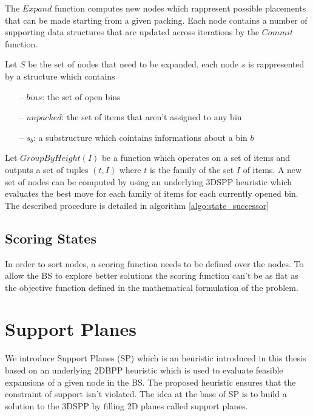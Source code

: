 

The $Expand$ function computes new nodes which rappresent possible placements that can be made starting from a given packing.
Each node contains a number of supporting data structures that are updated across iterations by the $Commit$ function.

Let $S$ be the set of nodes that need to be expanded, each node $s$ is rappresented by a structure which contains
\begin{itemize}
    \item[--] $bins$: the set of open bins
    \item[--] $unpacked$: the set of items that aren't assigned to any bin
    \item[--] $s_b$: a substructure which cointains informations about a bin $b$
\end{itemize}
Let $GroupByHeight(I)$ be a function which operates on a set of items and outputs a set of tuples $(t, I)$ where $t$ is the family of the set $I$ of items. %
A new set of nodes can be computed by using an underlying 3DSPP heuristic which evaluates the best move for each family of items for each currently opened bin.
The described procedure is detailed in algorithm \ref{algo:state_successor}  



\subsection{Scoring States}
\label{ssec:scoring_states}%
In order to sort nodes, a scoring function needs to be defined over the nodes. 
To allow the BS to explore better solutions the scoring function can't be as flat as the objective function defined in the mathematical formulation of the problem. %

\section{Support Planes}
\label{sec:support_planes}%
We introduce Support Planes (SP) which is an heuristic introduced in this thesis based on an underlying 2DBPP heuristic which is used to evaluate feasible expansions of a given node in the BS.
The proposed heuristic ensures that the constraint of support isn't violated.
The idea at the base of SP is to build a solution to the 3DSPP by filling 2D planes called support planes.

